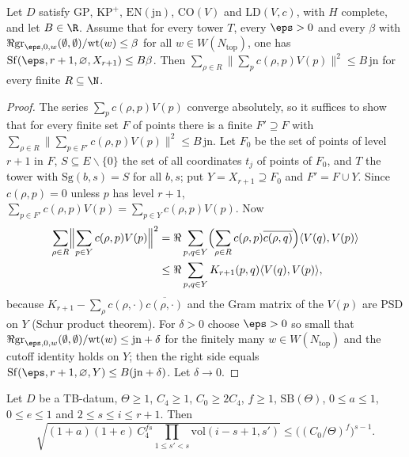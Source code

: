 \begin{lemma}\label{pf:thmS:limit}
Let $D$ satisfy $\mathrm{GP}$, $\mathrm{KP}^{+}$, $\mathrm{EN}(\mathrm{jn})$, $\mathrm{CO}(V)$ and
$\mathrm{LD}(V,c)$, with $H$ complete, and let $B\in\R$. Assume that for every tower $T$, every $\eps>0$
and every $\beta$ with $\Re\thmSgram_{\eps,0,w}(\emptyset,\emptyset)/\mathrm{wt}(w)\le\beta$ for all
$w\in W(N_{\mathrm{top}})$, one has $\thmSSf(\eps,r+1,\varnothing,X_{r+1})\le B\beta$. Then
$\sum_{\rho\in R}\|\sum_pc(\rho,p)V(p)\|^2\le B\,\mathrm{jn}$ for every finite $R\subseteq\N$.
\end{lemma}

\begin{proof}
The series $\sum_pc(\rho,p)V(p)$ converge absolutely, so it suffices to show that for every finite set $F$ of points
there is a finite $F'\supseteq F$ with $\sum_{\rho\in R}\|\sum_{p\in F'}c(\rho,p)V(p)\|^2\le B\,\mathrm{jn}$. Let $F_0$
be the set of points of level $r+1$ in $F$, $S\subseteq E\smallsetminus\{0\}$ the set of all coordinates $t_j$ of
points of $F_0$, and $T$ the tower with $\mathrm{Sg}(b,s)=S$ for all $b,s$; put $Y=X_{r+1}\supseteq F_0$ and
$F'=F\cup Y$. Since $c(\rho,p)=0$ unless $p$ has level $r+1$, $\sum_{p\in F'}c(\rho,p)V(p)=\sum_{p\in Y}c(\rho,p)V(p)$.
Now
\begin{align*}
\sum_{\rho\in R}\Bigl\|\sum_{p\in Y}c(\rho,p)V(p)\Bigr\|^2&=\Re\sum_{p,q\in Y}\Bigl(\sum_{\rho\in R}c(\rho,p)\overline{c(\rho,q)}\Bigr)
\langle V(q),V(p)\rangle\\
&\le\Re\sum_{p,q\in Y}K_{r+1}(p,q)\langle V(q),V(p)\rangle,
\end{align*}
because $K_{r+1}-\sum_\rho c(\rho,\cdot)\overline{c(\rho,\cdot)}$ and the Gram matrix of the $V(p)$ are PSD on $Y$ (Schur
product theorem). For $\delta>0$ choose $\eps>0$ so small that $\Re\thmSgram_{\eps,0,w}(\emptyset,\emptyset)/\mathrm{wt}(w)
\le\mathrm{jn}+\delta$ for the finitely many $w\in W(N_{\mathrm{top}})$ and the cutoff identity holds on $Y$; then the
right side equals $\thmSSf(\eps,r+1,\varnothing,Y)\le B(\mathrm{jn}+\delta)$. Let $\delta\to0$.
\end{proof}

\begin{lemma}\label{pf:thmS:coef}
Let $D$ be a TB-datum, $\Theta\ge1$, $C_4\ge1$, $C_0\ge2C_4$, $f\ge1$, $\mathrm{SB}(\Theta)$, $0\le a\le1$, $0\le e\le1$ and
$2\le s\le i\le r+1$. Then
\[
\sqrt{(1+a)(1+e)\,C_4^{fs}\textstyle\prod_{1\le s'<s}\mathrm{vol}(i-s+1,s')}\le\bigl((C_0/\Theta)^f\bigr)^{s-1}.
\]
\end{lemma}

